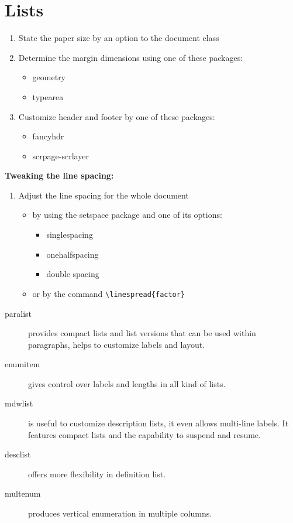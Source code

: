 \documentclass{article}
\begin{document}
\section*{Lists}
\begin{enumerate}[start=4]
    \item State the paper size by an option to the document class
    \item[6/2] Determine the margin dimensions using one of these packages:
    \begin{itemize}
        \item geometry
        \item typearea
    \end{itemize}
    \item Customize header and footer by one of these packages:
    \begin{itemize}
        \item fancyhdr
        \item scrpage-scrlayer
    \end{itemize}
\end{enumerate}
\noindent\textbf{Tweaking the line spacing:}
\begin{enumerate}[resume*]
    \item Adjust the line spacing for the whole document
    \begin{itemize}
        \item by using the setspace package and one of its options:
        \begin{itemize}[label=*]
            \item singlespacing
            \item onehalfspacing
            \item double spacing
        \end{itemize}
        \item or by the command
            \verb|\linespread{factor}|
    \end{itemize}
\end{enumerate}
\begin{description}
    \item[paralist] provides compact lists and list 
    versions that can be used within paragraphs,
    helps to customize labels and layout.
    \item[enumitem] gives control over labels and lengths in all kind of lists.
    \item[mdwlist] is useful to customize description lists,
    it even allows multi-line labels.
    It features compact lists and the capability to suspend and resume.
    \item[desclist] offers more flexibility in definition list.
    \item[multenum] produces vertical enumeration in multiple columns.
\end{description}
\newpage
\listdiagram
\end{document}
